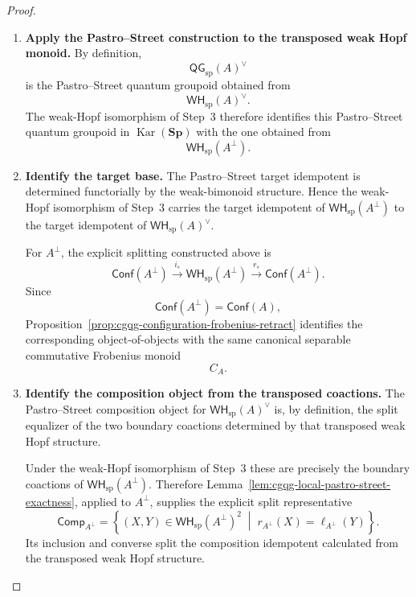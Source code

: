 \documentclass[oneside]{article}
\newcommand{\Conf}{\mathsf{Conf}}
\newcommand{\WH}{\mathsf{WH}}
\newcommand{\QG}{\mathsf{QG}}
\newcommand{\Sp}{\mathbf{Sp}}
\newcommand{\Kar}{\operatorname{Kar}}
\theoremstyle{plain}
\theoremstyle{definition}
\theoremstyle{remark}
\begin{document}
\begin{proof}
\begin{enumerate}[beginpenalty=10000]
        By
        Lemma~\ref{lem:cgqg-compact-transpose-weak-hopf}, these
        identifications assemble to an isomorphism of weak Hopf monoids
        \[
            \WH_{\mathrm{sp}}(A^\perp)
            \cong
            \WH_{\mathrm{sp}}(A)^\vee.
        \]
        This proves~\eqref{eq:cgqg-span-negation-dual}.

        \item \textbf{Apply the Pastro--Street construction to the
        transposed weak Hopf monoid.}
        By definition,
        \[
            \QG_{\mathrm{sp}}(A)^\vee
        \]
        is the Pastro--Street quantum groupoid obtained from
        \[
            \WH_{\mathrm{sp}}(A)^\vee.
        \]
        The weak-Hopf isomorphism of Step~3 therefore identifies this
        Pastro--Street quantum groupoid in \(\Kar(\Sp)\) with the one
        obtained from
        \[
            \WH_{\mathrm{sp}}(A^\perp).
        \]

        \item \textbf{Identify the target base.}
        The Pastro--Street target idempotent is determined functorially
        by the weak-bimonoid structure. Hence the weak-Hopf isomorphism
        of Step~3 carries the target idempotent of
        \(\WH_{\mathrm{sp}}(A^\perp)\) to the target idempotent of
        \(\WH_{\mathrm{sp}}(A)^\vee\).

        For \(A^\perp\), the explicit splitting constructed above is
        \[
            \Conf(A^\perp)
            \xrightarrow{i_s}
            \WH_{\mathrm{sp}}(A^\perp)
            \xrightarrow{r_s}
            \Conf(A^\perp).
        \]
        Since
        \[
            \Conf(A^\perp)=\Conf(A),
        \]
        Proposition~\ref{prop:cgqg-configuration-frobenius-retract}
        identifies the corresponding object-of-objects with the same
        canonical separable commutative Frobenius monoid
        \[
            C_A.
        \]

        \item \textbf{Identify the composition object from the
        transposed coactions.}
        The Pastro--Street composition object for
        \(\WH_{\mathrm{sp}}(A)^\vee\) is, by definition, the split
        equalizer of the two boundary coactions determined by that
        transposed weak Hopf structure.

        Under the weak-Hopf isomorphism of Step~3 these are precisely the
        boundary coactions of \(\WH_{\mathrm{sp}}(A^\perp)\). Therefore
        Lemma~\ref{lem:cgqg-local-pastro-street-exactness}, applied to
        \(A^\perp\), supplies the explicit split representative
        \[
            \mathsf{Comp}_{A^\perp}
            =
            \left\{
                (X,Y)
                \in
                \WH_{\mathrm{sp}}(A^\perp)^2
                \;\middle|\;
                r_{A^\perp}(X)
                =
                \ell_{A^\perp}(Y)
            \right\}.
        \]
        Its inclusion and converse split the composition idempotent
        calculated from the transposed weak Hopf structure.


\end{enumerate}
\end{proof}
\end{document}
